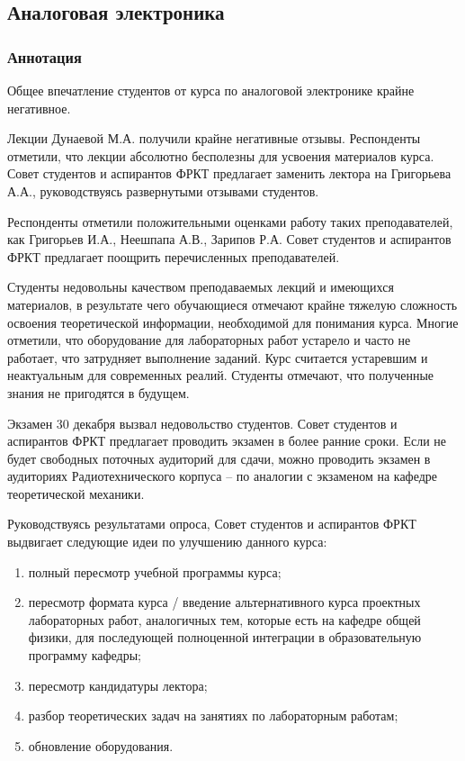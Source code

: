 \subsection{Аналоговая электроника}
	
	\subsubsection{Аннотация}

	Общее впечатление студентов от курса по аналоговой электронике крайне негативное.

	Лекции Дунаевой М.А. получили крайне негативные отзывы. Респонденты отметили, что лекции абсолютно бесполезны для усвоения материалов курса. Совет студентов и аспирантов ФРКТ предлагает заменить лектора на Григорьева А.А., руководствуясь развернутыми отзывами студентов.
	
	Респонденты отметили положительными оценками работу таких преподавателей, как Григорьев И.А., Неешпапа А.В., Зарипов Р.А. Совет студентов и аспирантов ФРКТ предлагает поощрить перечисленных преподавателей.
	
	Студенты недовольны качеством преподаваемых лекций и имеющихся материалов, в результате чего обучающиеся отмечают крайне тяжелую сложность освоения теоретической информации, необходимой для понимания курса. Многие отметили, что оборудование для лабораторных работ устарело и часто не работает, что затрудняет выполнение заданий. Курс считается устаревшим и неактуальным для современных реалий. Студенты отмечают, что полученные знания не пригодятся в будущем.

	Экзамен 30 декабря вызвал недовольство студентов. Совет студентов и аспирантов ФРКТ предлагает проводить экзамен в более ранние сроки. Если не будет свободных поточных аудиторий для сдачи, можно проводить экзамен в аудиториях Радиотехнического корпуса -- по аналогии с экзаменом на кафедре теоретической механики.

	Руководствуясь результатами опроса, Совет студентов и аспирантов ФРКТ выдвигает следующие идеи по улучшению данного курса:
	\begin{enumerate}
		\item полный пересмотр учебной программы курса;
		\item пересмотр формата курса / введение альтернативного курса проектных лабораторных работ, аналогичных тем, которые есть на кафедре общей физики, для последующей полноценной интеграции в образовательную программу кафедры;
		\item пересмотр кандидатуры лектора;
		\item разбор теоретических задач на занятиях по лабораторным работам;
		\item обновление оборудования.
	\end{enumerate}

